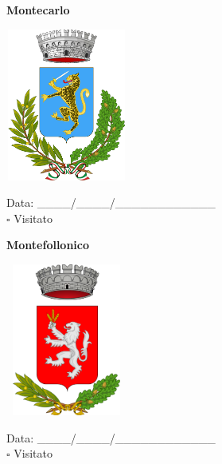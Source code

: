 \documentclass[a5paper,12pt]{article}
\begin{document}
\newpage

\noindent
\begin{minipage}[t]{0.45\textwidth}
    \begin{center}
        \textbf{Montecarlo}
    \end{center}
    \vspace{-0.5cm} %
    \begin{center}
        \includegraphics[height= 5cm, width=4cm]{Toscana/Stemma Montecarlo.png}
    \end{center}
    \vspace{-0.4cm} %
    \begin{flushleft}
        Data: \_\_\_\_/\_\_\_\_/\_\_\_\_\_\_\_\_\_\_\_\_ \\
        $\square$ Visitato
    \end{flushleft}
\end{minipage}
\hfill
\noindent
\begin{minipage}[t]{0.45\textwidth}
    \begin{center}
        \textbf{Montefollonico}
    \end{center}
    \vspace{-0.5cm} %
    \begin{center}
        \includegraphics[height= 5cm, width=4cm]{Toscana/Stemma Montefollonico.png}
    \end{center}
    \vspace{-0.4cm} %
    \begin{flushleft}
        Data: \_\_\_\_/\_\_\_\_/\_\_\_\_\_\_\_\_\_\_\_\_ \\
        $\square$ Visitato
    \end{flushleft}
\end{minipage}
\end{document}
